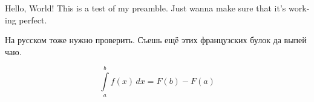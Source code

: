 \documentclass[a4paper, 12pt]{article}
\begin{document}
    \begin{english}
        Hello, World! This is a test of my preamble.
        Just wanna make sure that it's working perfect.
    \end{english}

    На русском тоже нужно проверить. Съешь ещё этих французских булок да выпей чаю.

    \begin{equation}
        \int\limits_a^b f(x)\, dx = F(b) - F(a)
    \end{equation}
\end{document}
